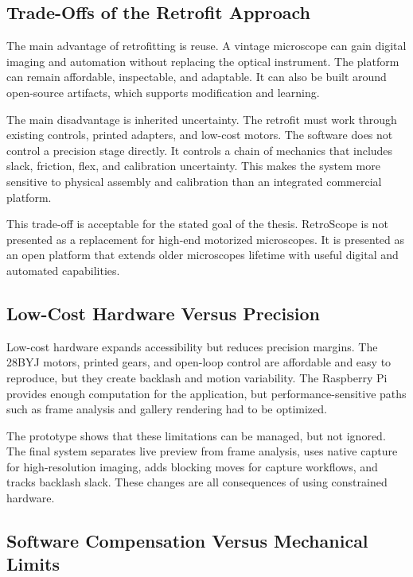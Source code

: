 \subsection{Trade-Offs of the Retrofit Approach}

The main advantage of retrofitting is reuse. A vintage microscope can gain digital imaging and automation without replacing the optical instrument. The platform can remain affordable, inspectable, and adaptable. It can also be built around open-source artifacts, which supports modification and learning.

The main disadvantage is inherited uncertainty. The retrofit must work through existing controls, printed adapters, and low-cost motors. The software does not control a precision stage directly. It controls a chain of mechanics that includes slack, friction, flex, and calibration uncertainty. This makes the system more sensitive to physical assembly and calibration than an integrated commercial platform.

This trade-off is acceptable for the stated goal of the thesis. RetroScope is not presented as a replacement for high-end motorized microscopes. It is presented as an open platform that extends older microscopes lifetime with useful digital and automated capabilities.

\subsection{Low-Cost Hardware Versus Precision}

Low-cost hardware expands accessibility but reduces precision margins. The 28BYJ motors, printed gears, and open-loop control are affordable and easy to reproduce, but they create backlash and motion variability. The Raspberry Pi provides enough computation for the application, but performance-sensitive paths such as frame analysis and gallery rendering had to be optimized.

The prototype shows that these limitations can be managed, but not ignored. The final system separates live preview from frame analysis, uses native capture for high-resolution imaging, adds blocking moves for capture workflows, and tracks backlash slack. These changes are all consequences of using constrained hardware.

\subsection{Software Compensation Versus Mechanical Limits}

